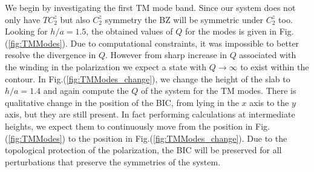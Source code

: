 We begin by investigating the first TM mode band. Since our system does not only have $TC_2^z$ but also $C_2^z$ symmetry the BZ will be symmetric under $C_2^z$ too. Looking for $h/a = 1.5$, the obtained values of $Q$ for the modes is given in Fig.(\ref{fig:TMModes}). Due to computational constraints, it was impossible to better resolve the divergence in $Q$. However from sharp increase in $Q$ associated with the winding in the polarization we expect a state with $Q\to\infty$ to exist within the contour. In Fig.(\ref{fig:TMModes_change}), we change the height of the slab to $h/a=1.4$ and again compute the $Q$ of the system for the TM modes. There is qualitative change in the position of the BIC, from lying in the $x$ axis to the $y$ axis, but they are still present. In fact performing calculations at intermediate heights, we expect them to continuously move from the position in Fig.(\ref{fig:TMModes}) to the position in Fig.(\ref{fig:TMModes_change}). Due to the topological protection of the polarization, the BIC will be preserved for all perturbations that preserve the symmetries of the system.

